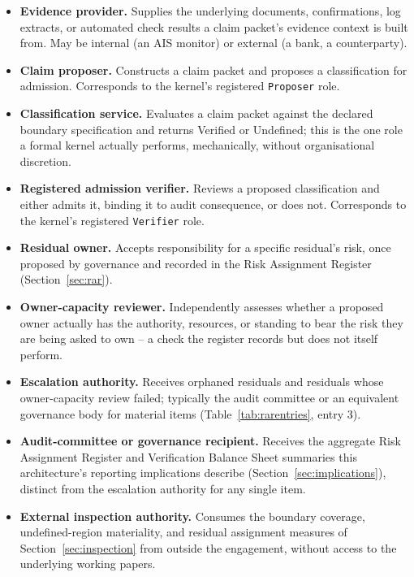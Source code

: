\documentclass[11pt,a4paper]{article}
\theoremstyle{definition}
\theoremstyle{remark}
\begin{document}
\begin{itemize}
\item \textbf{Evidence provider.} Supplies the underlying documents, confirmations, log extracts, or automated check results a claim packet's evidence context is built from. May be internal (an AIS monitor) or external (a bank, a counterparty).
\item \textbf{Claim proposer.} Constructs a claim packet and proposes a classification for admission. Corresponds to the kernel's registered \texttt{Proposer} role.
\item \textbf{Classification service.} Evaluates a claim packet against the declared boundary specification and returns \textsf{Verified} or \textsf{Undefined}; this is the one role a formal kernel actually performs, mechanically, without organisational discretion.
\item \textbf{Registered admission verifier.} Reviews a proposed classification and either admits it, binding it to audit consequence, or does not. Corresponds to the kernel's registered \texttt{Verifier} role.
\item \textbf{Residual owner.} Accepts responsibility for a specific residual's risk, once proposed by governance and recorded in the Risk Assignment Register (Section~\ref{sec:rar}).
\item \textbf{Owner-capacity reviewer.} Independently assesses whether a proposed owner actually has the authority, resources, or standing to bear the risk they are being asked to own -- a check the register records but does not itself perform.
\item \textbf{Escalation authority.} Receives orphaned residuals and residuals whose owner-capacity review failed; typically the audit committee or an equivalent governance body for material items (Table~\ref{tab:rarentries}, entry 3).
\item \textbf{Audit-committee or governance recipient.} Receives the aggregate Risk Assignment Register and Verification Balance Sheet summaries this architecture's reporting implications describe (Section~\ref{sec:implications}), distinct from the escalation authority for any single item.
\item \textbf{External inspection authority.} Consumes the boundary coverage, undefined-region materiality, and residual assignment measures of Section~\ref{sec:inspection} from outside the engagement, without access to the underlying working papers.
\end{itemize}
\end{document}
